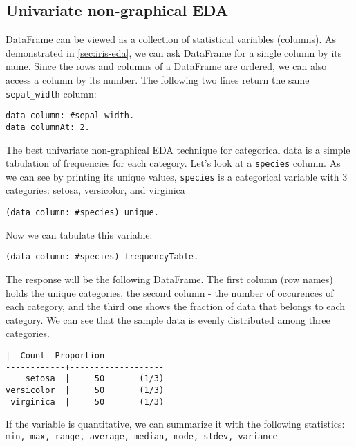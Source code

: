 \documentclass[sigplan]{acmart}
\begin{document}
\subsection{Univariate non-graphical EDA}
\label{sec:uni-non}

DataFrame can be viewed as a collection of statistical variables (columns). As demonstrated in \ref{sec:iris-eda}, we can ask DataFrame for a single column by its name. Since the rows and columns of a DataFrame are ordered, we can also access a column by its number. The following two lines return the same \texttt{sepal\_width} column:

\begin{lstlisting}[basicstyle=\small,language=Smalltalk]
data column: #sepal_width.
data columnAt: 2.
\end{lstlisting}

The best univariate non-graphical EDA technique for categorical data is a simple tabulation of frequencies for each category\cite{Seltman}. Let's look at a \texttt{species} column. As we can see by printing its unique values, \texttt{species} is a categorical variable with 3 categories: setosa, versicolor, and virginica

\begin{lstlisting}[basicstyle=\small,language=Smalltalk]
(data column: #species) unique.
\end{lstlisting}

Now we can tabulate this variable:

\begin{lstlisting}[basicstyle=\small,language=Smalltalk]
(data column: #species) frequencyTable.
\end{lstlisting}

The response will be the following DataFrame. The first column (row names) holds the unique categories, the second column - the number of occurences of each category, and the third one shows the fraction of data that belongs to each category. We can see that the sample data is evenly distributed among three categories.

\begin{lstlisting}[basicstyle=\small, belowskip=1em,]
            |  Count  Proportion  
------------+-------------------
    setosa  |     50       (1/3)  
versicolor  |     50       (1/3)  
 virginica  |     50       (1/3)
\end{lstlisting}

If the variable is quantitative, we can summarize it with the following statistics: \texttt{min, max, range, average, median, mode, stdev, variance}
\end{document}
